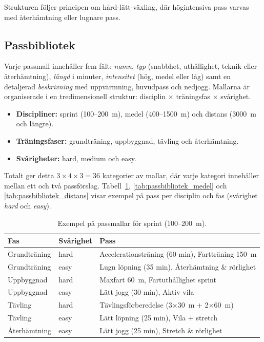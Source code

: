Strukturen följer principen om hård-lätt-växling, där högintensiva pass
varvas med återhämtning eller lugnare pass.

\subsection{Passbibliotek}
\label{app:mallar:pass}

Varje passmall innehåller fem fält: \textit{namn}, \textit{typ} (snabbhet,
uthållighet, teknik eller återhämtning), \textit{längd} i minuter,
\textit{intensitet} (hög, medel eller låg) samt en detaljerad
\textit{beskrivning} med uppvärmning, huvudpass och nedjogg. Mallarna är
organiserade i en tredimensionell struktur: disciplin $\times$ träningsfas
$\times$ svårighet.

\begin{itemize}
    \item \textbf{Discipliner:} sprint (100--200~m), medel (400--1500~m) och
    distans (3000~m och längre).
    \item \textbf{Träningsfaser:} grundträning, uppbyggnad, tävling och
    återhämtning.
    \item \textbf{Svårigheter:} hard, medium och easy.
\end{itemize}

Totalt ger detta $3 \times 4 \times 3 = 36$ kategorier av mallar, där varje
kategori innehåller mellan ett och två passförslag.
Tabell~\ref{tab:passbibliotek_sprint}, \ref{tab:passbibliotek_medel} och
\ref{tab:passbibliotek_distans} visar exempel på pass per disciplin och fas
(svårighet \textit{hard} och \textit{easy}).

\begin{table}[h]
\centering
\caption{Exempel på passmallar för sprint (100--200~m).}
\label{tab:passbibliotek_sprint}
\small
\begin{tabular}{l l p{}}
\hline
\textbf{Fas} & \textbf{Svårighet} & \textbf{Pass} \\
\hline
Grundträning & hard & Accelerationsträning (60 min), Fartträning 150~m \\
Grundträning & easy & Lugn löpning (35 min), Återhämtning \& rörlighet \\
Uppbyggnad   & hard & Maxfart 60~m, Fartuthållighet sprint \\
Uppbyggnad   & easy & Lätt jogg (30 min), Aktiv vila \\
Tävling      & hard & Tävlingsförberedelse (3$\times$30~m + 2$\times$60~m) \\
Tävling      & easy & Lätt löpning (25 min), Vila + stretch \\
Återhämtning & easy & Lätt jogg (25 min), Stretch \& rörlighet \\
\hline
\end{tabular}
\end{table}

